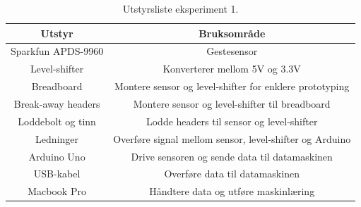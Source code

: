 \begin{table}[h!]
\begin{tabular}{|| c c ||}
\hline
 Utstyr & Bruksområde \\
 \hline\hline
 Sparkfun APDS-9960 & Gestesensor \\ 
 \hline
 Level-shifter & Konverterer mellom 5V og 3.3V \\
 \hline
 Breadboard & Montere sensor og level-shifter for enklere prototyping \\ 
 \hline
 Break-away headers & Montere sensor og level-shifter til breadboard   \\ 
 \hline
 Loddebolt og tinn & Lodde headers til sensor og level-shifter\\
 \hline
 Ledninger & Overføre signal mellom sensor, level-shifter og Arduino \\
 \hline
 Arduino Uno & Drive sensoren og sende data til datamaskinen\\
 \hline
 USB-kabel & Overføre data til datamaskinen \\
 \hline
 Macbook Pro & Håndtere data og utføre maskinlæring\\
 \hline
\end{tabular}
\caption{Utstyrsliste eksperiment 1.}
\label{table:utstyrsliste}
\end{table}

